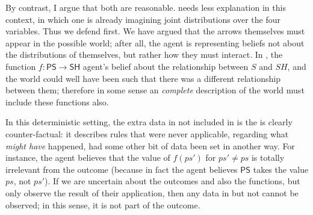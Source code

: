 \documentclass{article}
\theoremstyle{definition}
\theoremstyle{remark}
\newcommand{\var}[1]{\mathsf{#1}}
\begin{document}
\begin{example}
    By contrast, I argue that both  are reasonable.  needs less explanation in this context, in which one is already imagining joint distributions over the four variables. Thus we defend  first.
    We have argued that the arrows themselves must appear in the possible world; after all, the agent is representing beliefs not about the distributions of themselves, but rather how they must interact.
    In , the function $f: \var{PS} \to \var{SH}$ agent's belief about the relationship between $S$ and $SH$, and the world could well have been such that there was a different relationship between them; therefore in some sense an \emph{complete} description of the world must include these functions also. 
         
    In this deterministic setting, the extra data in  not included in  is the is clearly counter-factual: it describes rules that were never applicable, regarding what \emph{might have} happened, had some other bit of data been set in another way. For instance, the agent believes that the value of $f(ps')$ for $ps' \neq ps$ is totally irrelevant from the outcome (because in fact the agent believes $\var{PS}$ takes the value $ps$, not $ps'$). 
    If we are uncertain about the outcomes and also the functions, but only observe the result of their application, then any data in  but not  cannot be observed; in this sense, it is not part of the outcome. 
\end{example}
\end{document}
